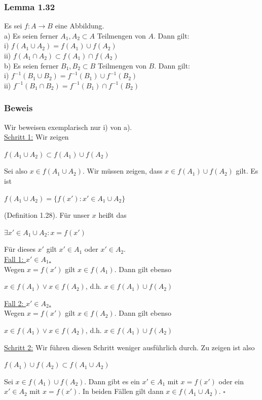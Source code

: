 \documentclass{article}
\begin{document}
\subsubsection*{Lemma 1.32}
Es sei $f: A \rightarrow B$ eine Abbildung. \\
a) Es seien ferner $A_1, A_2 \subset A$ Teilmengen von $A$. Dann gilt: \\
\hspace{1cm} i) $f(A_1 \cup A_2) = f(A_1) \cup f(A_2)$ \\
\hspace{1cm} ii) $f(A_1 \cap A_2) \subset f(A_1) \cap f(A_2)$ \\
b) Es seien ferner $B_1, B_2 \subset B$ Teilmengen von $B$. Dann gilt: \\
\hspace{1cm} i) $f^{-1}(B_1 \cup B_2) = f^{-1}(B_1) \cup f^{-1}(B_2)$ \\
\hspace{1cm} ii) $f^{-1}(B_1 \cap B_2) = f^{-1}(B_1) \cap f^{-1}(B_2)$

\subsubsection*{Beweis}
Wir beweisen exemplarisch nur i) von a).\\ 
\underline{Schritt 1:} Wir zeigen 
\begin{center}
    $f(A_1 \cup A_2) \subset f(A_1) \cup f(A_2)$ 
\end{center}
Sei also $x \in f(A_1 \cup A_2)$. Wir müssen zeigen, dass $x \in f(A_1) \cup f(A_2)$ gilt. 
Es ist 
\begin{center}
    $f(A_1 \cup A_2) = \{f(x'): x' \in A_1 \cup A_2\}$
\end{center}
(Definition 1.28). Für unser $x$ heißt das
\begin{center}
    $\exists x' \in A_1 \cup A_2: x = f(x')$
\end{center}
Für dieses $x'$ gilt $x' \in A_1$ oder $x' \in A_2$. \\
\underline{Fall 1: $x' \in A_1$.} \\
Wegen $x=f(x')$ gilt $x \in f(A_1)$. Dann gilt ebenso 
\begin{center}
    $x \in f(A_1) \vee x \in f(A_2)$, d.h. $x \in f(A_1) \cup f(A_2)$
\end{center}
\underline{Fall 2: $x' \in A_2$.} \\
Wegen $x=f(x')$ gilt $x \in f(A_2)$. Dann gilt ebenso 
\begin{center}
    $x \in f(A_1) \vee x \in f(A_2)$, d.h. $x \in f(A_1) \cup f(A_2)$
\end{center}
\underline{Schritt 2:} Wir führen diesen Schritt weniger ausführlich durch. Zu zeigen ist also 
\begin{center}
    $f(A_1) \cup f(A_2) \subset f(A_1 \cup A_2)$
\end{center}
Sei $x \in f(A_1) \cup f(A_2)$. Dann gibt es ein $x' \in A_1$ mit $x=f(x')$ oder ein $x' \in A_2$ mit $x=f(x')$. 
In beiden Fällen gilt dann $x \in f(A_1 \cup A_2)$. $\square$
\end{document}
